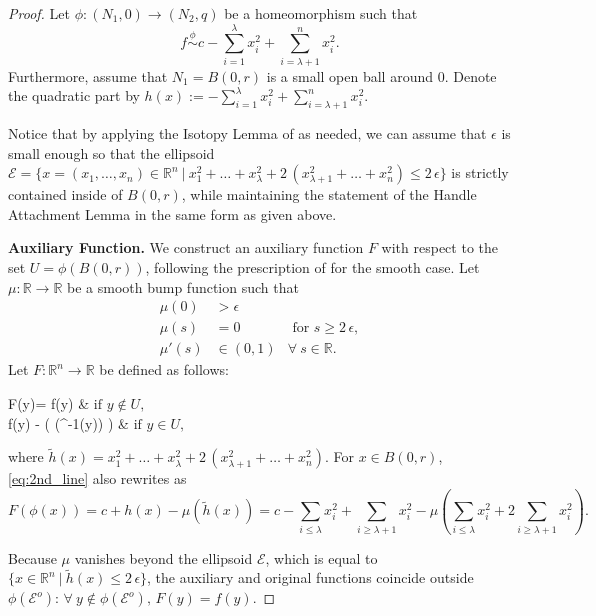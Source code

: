 \documentclass[11pt]{article}
\newcommand{\R}{\mathbb{R}}
\newcommand{\eps}{\epsilon}
\theoremstyle{plain}
\theoremstyle{definition}
\theoremstyle{remark}
\begin{document}
	\begin{proof}
		Let $\phi : (N_1, 0) \to (N_2, q)$ be a homeomorphism such that	
		\[f \overset{\phi}{\sim} c - \sum_{i = 1}^{\lambda} x_i^2 + \sum_{i = \lambda + 1}^n x_i^2.\] 
		Furthermore, assume that $N_1 = B(0,r)$ is a small open ball around $0$. Denote the quadratic part by $h(x) := - \sum_{i = 1}^{\lambda} x_i^2 + \sum_{i = \lambda + 1}^n x_i^2$.
		
		Notice that by applying the Isotopy Lemma of  as needed, we can assume that $\eps$ is small enough so that the ellipsoid $\mathcal{E} = \{x = (x_1,\ldots, x_n) \in \R^n ~|~ x_1^2 + \ldots + x_{\lambda}^2 + 2 \, (x_{\lambda + 1}^2 + \ldots + x_n^2) \leq 2\, \eps \}$ is strictly contained inside of $B(0, r)$, while maintaining the statement of the Handle Attachment Lemma in the same form as given above. 
		
		\textbf{Auxiliary Function.}
		We construct an auxiliary function $F$ with respect to the set $U = \phi(B(0,r))$, following the prescription of \cite{milnor_morse_1963} for the smooth case. Let $\mu : \R \to \R$ be a smooth bump function such that
		\begin{align*}
			\mu(0) &> \eps & \\
			\mu(s) &= 0 & \text{ for } s \geq 2\,\eps, \\
			\mu'(s) &\in (0,1) & \forall\ s \in \R.
		\end{align*}
		Let $F : \R^n \to \R$ be defined as follows:
		\begin{numcases}{F(y)=}
			f(y) &$\text{ if } y \notin U,$ \nonumber\\
			f(y) - \mu( (\phi^{-1}(y)) ) &$\text{ if } y \in U,$ \label{eq:2nd_line}
		\end{numcases}
		where $\tilde{h}(x) = x_1^2 + \ldots + x_\lambda^2 + 2 \, (x_{\lambda + 1}^2 + \ldots + x_n^2)$.
		For $x \in B(0,r)$, \eqref{eq:2nd_line} also rewrites as 
		$$F(\phi(x)) = c + h(x) - \mu(\tilde{h}(x)) = c - \sum\limits_{i \leq \lambda} x_i^2 + \sum\limits_{i \geq \lambda + 1} x_i^2 - \mu\left( \sum\limits_{i \leq \lambda} x_i^2 + 2 \sum\limits_{i \geq \lambda + 1} x_i^2 \right).
		$$
		
		Because $\mu$ vanishes beyond the ellipsoid $\mathcal{E}$, which is equal to $\{x \in \R^n ~|~ \tilde{h}(x) \leq 2\,\eps\}$, the auxiliary and original functions coincide outside $\phi(\mathcal{E}^o)$: $\forall\ y \notin \phi(\mathcal{E}^o),\,  F(y)= f(y)$. 
		

\end{proof}
\end{document}
